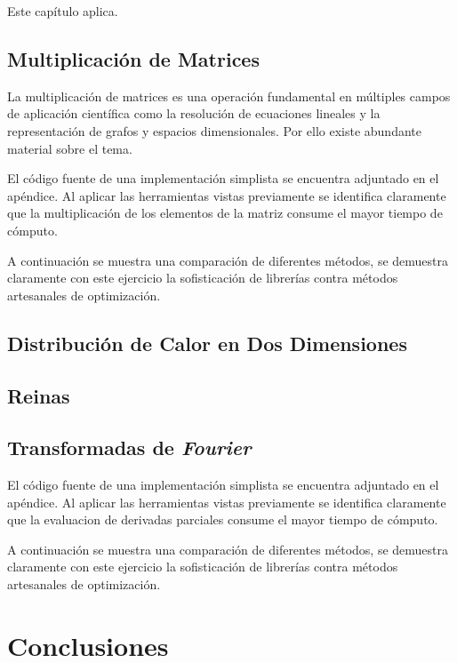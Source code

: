 \documentclass[a4paper]{report}
\begin{document}
Este cap\'itulo aplica.

\section{Multiplicaci\'on de Matrices}

La multiplicaci\'on de matrices es una operaci\'on fundamental en m\'ultiples campos
de aplicaci\'on cient\'ifica como la resoluci\'on de ecuaciones lineales y la
representaci\'on de grafos y espacios dimensionales. Por ello existe abundante
material sobre el tema.

\bigskip

El c\'odigo fuente de una implementaci\'on simplista se encuentra adjuntado en el
ap\'endice. Al aplicar las herramientas vistas previamente se identifica claramente
que la multiplicaci\'on de los elementos de la matriz consume el mayor tiempo de
c\'omputo.

\bigskip

A continuaci\'on se muestra una comparaci\'on de diferentes m\'etodos, se demuestra
claramente con este ejercicio la sofisticaci\'on de librer\'ias contra m\'etodos
artesanales de optimizaci\'on.

\section{Distribuci\'on de Calor en Dos Dimensiones}

\section{Reinas}

\section{Transformadas de {\it Fourier}}

El c\'odigo fuente de una implementaci\'on simplista se encuentra adjuntado en el
ap\'endice. Al aplicar las herramientas vistas previamente se identifica claramente
que la evaluacion de derivadas parciales consume el mayor tiempo de c\'omputo.

\bigskip

A continuaci\'on se muestra una comparaci\'on de diferentes m\'etodos, se demuestra
claramente con este ejercicio la sofisticaci\'on de librer\'ias contra m\'etodos
artesanales de optimizaci\'on.

\chapter{Conclusiones}
\end{document}
